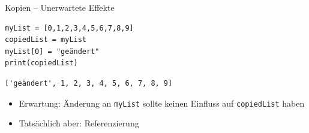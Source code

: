 \begin{frame}[fragile]{Kopien -- Unerwartete Effekte}
%
\begin{tcbraster}[raster columns=2,
                  raster equal height,
                  nobeforeafter,
                  raster column skip=0.5cm]
\begin{codebox}
\begin{verbatim}
myList = [0,1,2,3,4,5,6,7,8,9]
copiedList = myList
myList[0] = "geändert"
print(copiedList)
\end{verbatim}
\end{codebox}
%
\begin{cmdbox}[Ausgabe]
\begin{verbatim}
['geändert', 1, 2, 3, 4, 5, 6, 7, 8, 9]
\end{verbatim}
\end{cmdbox}
\end{tcbraster}
%
\begin{itemize}
\item Erwartung: Änderung an \texttt{myList} sollte keinen Einfluss auf \texttt{copiedList} haben
\item Tatsächlich aber: Referenzierung
\end{itemize}
%
\end{frame}


